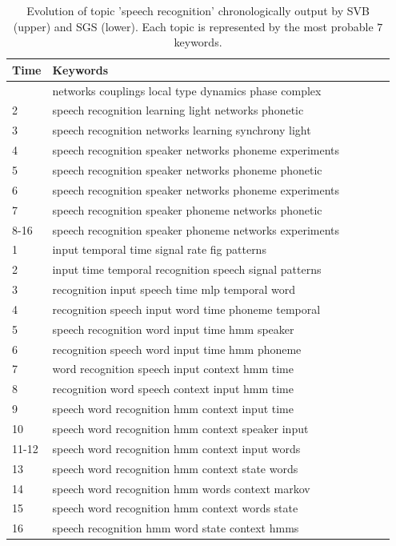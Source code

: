 \documentclass{article}
\begin{document}
\begin{table}[t]
\caption{Evolution of topic 'speech recognition' chronologically output by SVB (upper) and SGS (lower). Each topic is represented by the most probable $7$ keywords.}
\label{tbl:evolution_of_topics}
\vskip 0.15in
\begin{center}
\begin{small}
\begin{tabular}{llllll}
\hline
\abovespace\belowspace
{\sc Time} & {\sc Keywords} \\
\hline
\abovespace
1 & networks couplings local type dynamics phase complex \\
2 & speech recognition learning light networks phonetic  \\
3 & speech recognition networks learning synchrony light  \\
4 & speech recognition speaker networks phoneme experiments  \\
5 & speech recognition speaker networks phoneme phonetic  \\
6 & speech recognition speaker networks phoneme experiments  \\
7 & speech recognition speaker phoneme networks phonetic  \\
8-16 & speech recognition speaker phoneme networks experiments  \\

\hline
\hline
 1 & input temporal time signal rate fig patterns \\
 2 & input time temporal recognition speech signal patterns \\
 3 & recognition input speech time mlp temporal word \\
 4 & recognition speech input word time phoneme temporal \\
 5 & speech recognition word input time hmm speaker \\
 6 & recognition speech word input time hmm phoneme \\
 7 & word recognition speech input context hmm time \\
 8 & recognition word speech context input hmm time \\
 9 & speech word recognition hmm context input time \\
 10 & speech word recognition hmm context speaker input \\
 11-12 & speech word recognition hmm context input words \\
 13 & speech word recognition hmm context state words \\
 14 & speech word recognition hmm words context markov \\
 15 & speech word recognition hmm context words state \\
 16 & speech recognition hmm word state context hmms\\

\hline
\hline
\end{tabular}
\end{small}
\end{center}
\vskip -0.1in
\end{table}
\end{document}
